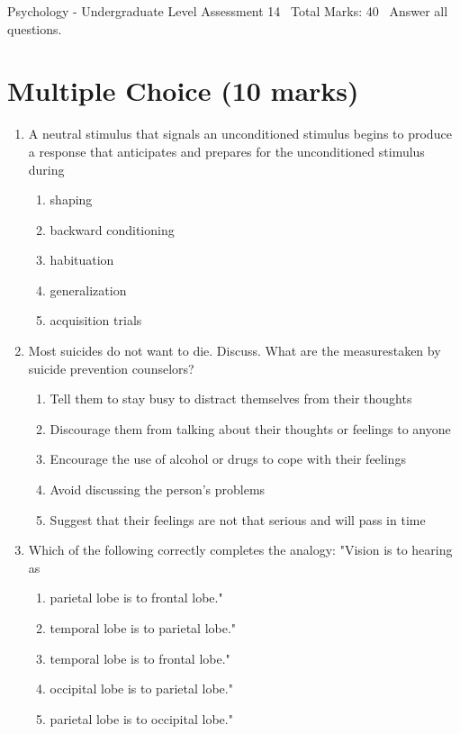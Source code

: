 \documentclass[12pt]{article}
\begin{document}
\begin{center}
Psychology - Undergraduate Level Assessment 14 \
Total Marks: 40 \
Answer all questions.
\end{center}

\section*{Multiple Choice (10 marks)}
\begin{enumerate}[label=\arabic*.]
\item A neutral stimulus that signals an unconditioned stimulus begins to produce a response that anticipates and prepares for the unconditioned stimulus during
\begin{enumerate}[label=(\alph*)]
    \item shaping
    \item backward conditioning
    \item habituation
    \item generalization
    \item acquisition trials
\end{enumerate}
\item Most suicides do not want to die. Discuss. What are the measurestaken by suicide prevention counselors?
\begin{enumerate}[label=(\alph*)]
    \item Tell them to stay busy to distract themselves from their thoughts
    \item Discourage them from talking about their thoughts or feelings to anyone
    \item Encourage the use of alcohol or drugs to cope with their feelings
    \item Avoid discussing the person's problems
    \item Suggest that their feelings are not that serious and will pass in time
\end{enumerate}
\item Which of the following correctly completes the analogy: "Vision is to hearing as
\begin{enumerate}[label=(\alph*)]
    \item parietal lobe is to frontal lobe."
    \item temporal lobe is to parietal lobe."
    \item temporal lobe is to frontal lobe."
    \item occipital lobe is to parietal lobe."
    \item parietal lobe is to occipital lobe."

\end{enumerate}
\end{enumerate}
\end{document}
